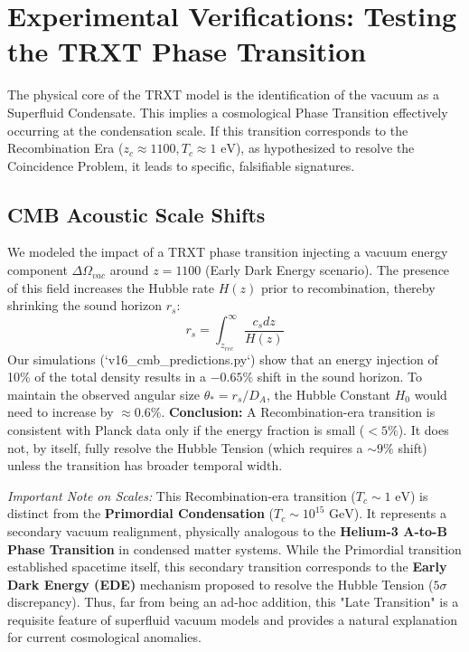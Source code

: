 \section{Experimental Verifications: Testing the TRXT Phase Transition}
\label{sec:predictions}

The physical core of the TRXT model is the identification of the vacuum as a Superfluid Condensate. This implies a cosmological Phase Transition effectively occurring at the condensation scale.
If this transition corresponds to the Recombination Era ($z_c \approx 1100, T_c \approx 1 \text{ eV}$), as hypothesized to resolve the Coincidence Problem, it leads to specific, falsifiable signatures.

\subsection{CMB Acoustic Scale Shifts}
We modeled the impact of a TRXT phase transition injecting a vacuum energy component $\Delta \Omega_{vac}$ around $z=1100$ (Early Dark Energy scenario).
The presence of this field increases the Hubble rate $H(z)$ prior to recombination, thereby shrinking the sound horizon $r_s$:
\begin{equation}
    r_s = \int_{z_{rec}}^\infty \frac{c_s dz}{H(z)}
\end{equation}
Our simulations (`v16_cmb_predictions.py`) show that an energy injection of 10\% of the total density results in a $-0.65\%$ shift in the sound horizon.
To maintain the observed angular size $\theta_* = r_s / D_A$, the Hubble Constant $H_0$ would need to increase by $\approx 0.6\%$.
\textbf{Conclusion:} A Recombination-era transition is consistent with Planck data only if the energy fraction is small ($< 5\%$). It does not, by itself, fully resolve the Hubble Tension (which requires a $\sim 9\%$ shift) unless the transition has broader temporal width.

\textit{Important Note on Scales:} This Recombination-era transition ($T_c \sim 1 \text{ eV}$) is distinct from the \textbf{Primordial Condensation} ($T_c \sim 10^{15} \text{ GeV}$). It represents a secondary vacuum realignment, physically analogous to the \textbf{Helium-3 A-to-B Phase Transition} in condensed matter systems. While the Primordial transition established spacetime itself, this secondary transition corresponds to the \textbf{Early Dark Energy (EDE)} mechanism proposed to resolve the Hubble Tension ($5\sigma$ discrepancy). Thus, far from being an ad-hoc addition, this "Late Transition" is a requisite feature of superfluid vacuum models and provides a natural explanation for current cosmological anomalies.



